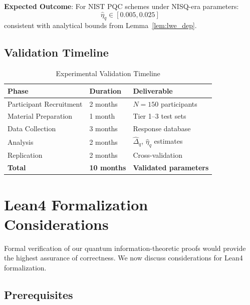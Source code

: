 \documentclass{ieeeaccess}
\begin{document}
\textbf{Expected Outcome}: For NIST PQC schemes under NISQ-era parameters:
\begin{equation}
    \hat{\eta}_q \in [0.005, 0.025]
\end{equation}
consistent with analytical bounds from Lemma~\ref{lem:lwe_dep}.

\subsection{Validation Timeline}

\begin{table}[h]
\centering
\caption{Experimental Validation Timeline}
\label{tab:validation_timeline}
\setlength{\tabcolsep}{3pt}
\begin{tabular}{p{3cm}p{2.5cm}p{3cm}}
\toprule
\textbf{Phase} & \textbf{Duration} & \textbf{Deliverable} \\
\midrule
Participant Recruitment & 2 months & $N = 150$ participants \\
Material Preparation & 1 month & Tier 1--3 test sets \\
Data Collection & 3 months & Response database \\
Analysis & 2 months & $\hat{\Delta}_q$, $\hat{\eta}_q$ estimates \\
Replication & 2 months & Cross-validation \\
\midrule
\textbf{Total} & \textbf{10 months} & \textbf{Validated parameters} \\
\bottomrule
\end{tabular}
\end{table}


\section{Lean4 Formalization Considerations}\label{app:lean4}

Formal verification of our quantum information-theoretic proofs would provide the highest assurance of correctness. We now discuss considerations for Lean4 formalization.

\subsection{Prerequisites}
\end{document}
